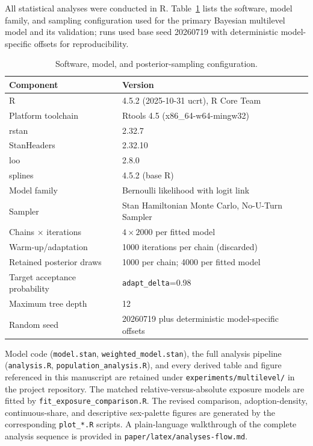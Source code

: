 All statistical analyses were conducted in R. Table~\ref{tab:session-info} lists the software, model family, and sampling configuration used for the primary Bayesian multilevel model and its validation; runs used base seed 20260719 with deterministic model-specific offsets for reproducibility.

\begin{table}[htbp]
\centering
\caption{Software, model, and posterior-sampling configuration.}
\label{tab:session-info}
\begin{tabular}{ll}
\toprule
Component & Version \\
\midrule
R & 4.5.2 (2025-10-31 ucrt), R Core Team \\
Platform toolchain & Rtools 4.5 (x86\_64-w64-mingw32) \\
rstan & 2.32.7 \\
StanHeaders & 2.32.10 \\
loo & 2.8.0 \\
splines & 4.5.2 (base R) \\
Model family & Bernoulli likelihood with logit link \\
Sampler & Stan Hamiltonian Monte Carlo, No-U-Turn Sampler \\
Chains $\times$ iterations & $4 \times 2000$ per fitted model \\
Warm-up/adaptation & 1000 iterations per chain (discarded) \\
Retained posterior draws & 1000 per chain; 4000 per fitted model \\
Target acceptance probability & \texttt{adapt\_delta}=0.98 \\
Maximum tree depth & 12 \\
Random seed & 20260719 plus deterministic model-specific offsets \\
\bottomrule
\end{tabular}
\end{table}

\begin{sloppypar}
Model code (\texttt{model.\allowbreak stan}, \texttt{weighted\_\allowbreak model.\allowbreak stan}), the full analysis pipeline (\texttt{analysis.\allowbreak R}, \texttt{population\_\allowbreak analysis.\allowbreak R}), and every derived table and figure referenced in this manuscript are retained under \texttt{experiments/\allowbreak multilevel/} in the project repository. The matched relative-versus-absolute exposure models are fitted by \texttt{fit\_\allowbreak exposure\_\allowbreak comparison.\allowbreak R}. The revised comparison, adoption-density, continuous-share, and descriptive sex-palette figures are generated by the corresponding \texttt{plot\_*.R} scripts. A plain-language walkthrough of the complete analysis sequence is provided in \texttt{paper/\allowbreak latex/\allowbreak analyses-flow.\allowbreak md}.
\end{sloppypar}
